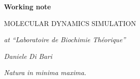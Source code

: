 \begin{titlepage}
\pagestyle{empty}


\begin{center}

\vspace*{12cm}  

\begin{Large}
\textbf{Working note}

\vspace*{0.5cm}

MOLECULAR DYNAMICS SIMULATION

\vspace*{0.3cm}

\textit{at ``Laboratoire de Biochimie Théorique''}
\end{Large}

\vspace*{6cm}

\begin{minipage}{0.45\textwidth}
\begin{flushleft} \large

\end{flushleft}
\end{minipage}
\hfill
\begin{minipage}{0.5\textwidth}
\begin{flushright} \large
\textit{Daniele Di Bari}
\end{flushright}
\end{minipage}

\vspace*{1.5cm}

\end{center}
\cleardoublepage
\end{titlepage}

{\pagestyle{empty}

\null{}
\begin{flushright}
\textit{Natura in minima maxima.}
\end{flushright}
\null{}

\cleardoublepage}

\frontmatter 

\cleardoublepage
{}
\tableofcontents %

\mainmatter %
